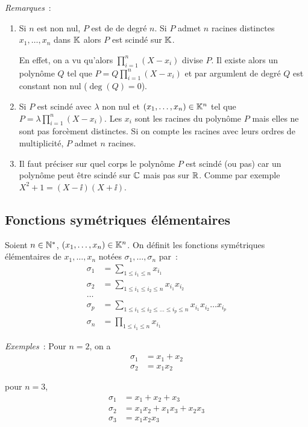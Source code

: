 \emph{Remarques}~:
\begin{enumerate}
\item Si $n$ est non nul, $P$ est de de degré $n$. Si $P$ admet $n$ racines distinctes $x_1, \ldots, x_n$ dans $\mathbb{K}$ alors $P$ est scindé sur $\mathbb{K}$.

  En effet, on a vu qu'alors $\prod_{i=1}^n(X-x_i)$ divise $P$. Il existe alors un polynôme $Q$ tel que $P=Q\prod_{i=1}^n(X-x_i)$ et par argumlent de degré $Q$ est constant non nul ($\deg(Q)=0$).
\item Si $P$ est scindé avec $\lambda$ non nul et $(x_1, \ldots, x_n) \in \mathbb{K}^n$ tel que $P = \lambda \prod_{i=1}^n (X-x_i)$. Les $x_i$ sont les racines du polynôme $P$ mais elles ne sont pas forcèment distinctes. Si on compte les racines avec leurs ordres de multiplicité, $P$ admet $n$ racines.
\item Il faut préciser sur quel corps le polynôme $P$ est scindé (ou pas) car un polynôme peut être scindé sur $\mathbb{C}$ mais pas sur $\mathbb{R}$. Comme par exemple $X^2+1=(X-\ii)(X+\ii)$.
\end{enumerate}

\subsection{Fonctions symétriques élémentaires}

\begin{defdef}
  Soient $n \in \mathbb{N}^*$, $(x_1, \ldots, x_n) \in \mathbb{K}^n$. On définit les fonctions symétriques élémentaires de $x_1, \ldots, x_n$ notées $\sigma_1, \ldots, \sigma_n$ par~:
  \begin{align}
    \sigma_1 &=\sum_{1\leq i_1 \leq n} x_{i_1} \\
    \sigma_2 &=\sum_{1\leq i_1 \leq i_2 \leq n} x_{i_1} x_{i_2} \\
    \ldots \\
    \sigma_p &=\sum_{1\leq i_1 \leq i_2 \leq \ldots \leq i_p\leq n} x_{i_1} x_{i_2} \ldots x_{i_p} \\
    \sigma_n &= \prod_{1 \leq i_1 \leq n} x_{i_1}
  \end{align}
\end{defdef}

\emph{Exemples}~: Pour $n=2$, on a
\begin{align}
  \sigma_1 &=x_1+x_2 \\
  \sigma_2 &=x_1x_2
\end{align}

pour $n=3$, 
\begin{align}
  \sigma_1 &=x_1+x_2+x_3 \\
  \sigma_2 &=x_1x_2+x_1x_3 + x_2x_3 \\
  \sigma_3 &= x_1x_2x_3 
\end{align}

